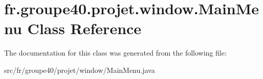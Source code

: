 \hypertarget{classfr_1_1groupe40_1_1projet_1_1window_1_1_main_menu}{}\section{fr.\+groupe40.\+projet.\+window.\+Main\+Menu Class Reference}
\label{classfr_1_1groupe40_1_1projet_1_1window_1_1_main_menu}


The documentation for this class was generated from the following file\+:\begin{DoxyCompactItemize}
\item 
src/fr/groupe40/projet/window/Main\+Menu.\+java\end{DoxyCompactItemize}
